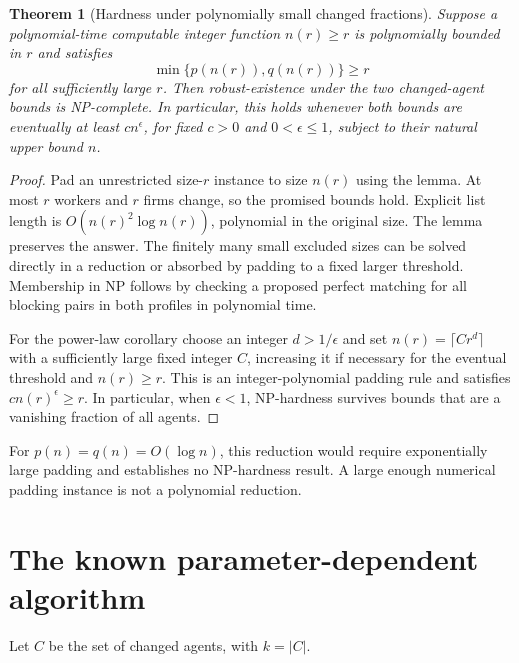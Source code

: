 \documentclass[11pt,a4paper]{article}
\newtheorem{theorem}{Theorem}[section]
\theoremstyle{definition}
\theoremstyle{remark}
\begin{document}
\begin{theorem}[Hardness under polynomially small changed fractions]
Suppose a polynomial-time computable integer function $n(r)\geq r$ is polynomially bounded in $r$ and satisfies
\[
 \min\{p(n(r)),q(n(r))\}\geq r
\]
for all sufficiently large $r$. Then robust-existence under the two changed-agent bounds is NP-complete. In particular, this holds whenever both bounds are eventually at least $c n^\epsilon$, for fixed $c>0$ and $0<\epsilon\leq1$, subject to their natural upper bound $n$.
\end{theorem}
\begin{proof}
Pad an unrestricted size-$r$ instance to size $n(r)$ using the lemma. At most $r$ workers and $r$ firms change, so the promised bounds hold. Explicit list length is $O(n(r)^2\log n(r))$, polynomial in the original size. The lemma preserves the answer. The finitely many small excluded sizes can be solved directly in a reduction or absorbed by padding to a fixed larger threshold. Membership in NP follows by checking a proposed perfect matching for all blocking pairs in both profiles in polynomial time.

For the power-law corollary choose an integer $d>1/\epsilon$ and set $n(r)=\lceil C r^d\rceil$ with a sufficiently large fixed integer $C$, increasing it if necessary for the eventual threshold and $n(r)\geq r$. This is an integer-polynomial padding rule and satisfies $cn(r)^\epsilon\geq r$. In particular, when $\epsilon<1$, NP-hardness survives bounds that are a vanishing fraction of all agents.
\end{proof}

For $p(n)=q(n)=O(\log n)$, this reduction would require exponentially large padding and establishes no NP-hardness result. A large enough numerical padding instance is not a polynomial reduction.

\section{The known parameter-dependent algorithm}
Let $C$ be the set of changed agents, with $k=|C|$.
\end{document}

